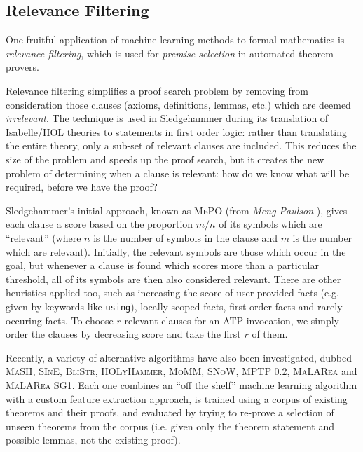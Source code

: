 \subsection{Relevance Filtering}
\label{sec:relevance}

\cite{kuhlwein2012overview}

One fruitful application of machine learning methods to formal mathematics is
\emph{relevance filtering}, which is used for \emph{premise selection} in
automated theorem provers.

Relevance filtering simplifies a proof search problem by removing from
consideration those clauses (axioms, definitions, lemmas, etc.) which are deemed
\emph{irrelevant}. The technique is used in Sledgehammer during its translation
of Isabelle/HOL theories to statements in first order logic: rather than
translating the entire theory, only a sub-set of relevant clauses are
included. This reduces the size of the problem and speeds up the proof search,
but it creates the new problem of determining when a clause is relevant: how do
we know what will be required, before we have the proof?

Sledgehammer's initial approach, known as \textsc{MePO} (from
\emph{Meng-Paulson} \cite{meng2009lightweight}), gives each clause a score based
on the proportion $m / n$ of its symbols which are ``relevant'' (where $n$ is
the number of symbols in the clause and $m$ is the number which are relevant).
Initially, the relevant symbols are those which occur in the goal, but whenever
a clause is found which scores more than a particular threshold, all of its
symbols are then also considered relevant. There are other heuristics applied
too, such as increasing the score of user-provided facts (e.g. given by keywords
like \texttt{using}), locally-scoped facts, first-order facts and
rarely-occuring facts. To choose $r$ relevant clauses for an ATP invocation, we
simply order the clauses by decreasing score and take the first $r$ of them.

Recently, a variety of alternative algorithms have also been investigated,
dubbed \textsc{MaSH}, \textsc{SInE}, \textsc{BliStr}, \textsc{HOLyHammer},
\textsc{MoMM}, \textsc{SNoW}, \textsc{MPTP 0.2}, \textsc{MaLARea} and
\textsc{MaLARea SG1}. Each one combines an ``off the shelf'' machine learning
algorithm with a custom feature extraction approach, is trained using a corpus
of existing theorems and their proofs, and evaluated by trying to re-prove a
selection of unseen theorems from the corpus (i.e. given only the theorem
statement and possible lemmas, not the existing proof).

